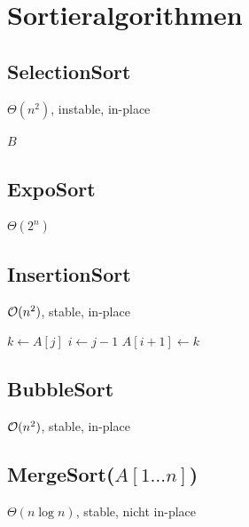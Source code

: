 \section*{Sortieralgorithmen}

\subsection*{SelectionSort}
$\Theta(n^2)$, instable, in-place

\begin{algorithm}[H]
	\KwRet $B$\;
\end{algorithm}

\subsection*{ExpoSort}
$\Theta(2^n)$

\begin{algorithm}[H]
\end{algorithm}

\subsection*{InsertionSort}
$\mathcal{O}(n^2)$, stable, in-place

\begin{algorithm}[H]
	 {
		$k \gets A[j]$\;
		$i \gets j-1$\;
		$A[i+1] \gets k$\;
	}
\end{algorithm}

\subsection*{BubbleSort}
$\mathcal{O}(n^2)$, stable, in-place

\begin{algorithm}[H]
\end{algorithm}

\subsection*{MergeSort($A[1\ldots n]$)}
$\Theta(n\log n)$, stable, nicht in-place

